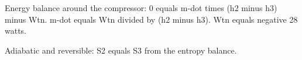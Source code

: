 Energy balance around the compressor:  
0 equals m-dot times (h2 minus h3) minus Wtn.  
m-dot equals Wtn divided by (h2 minus h3).  
Wtn equals negative 28 watts.  

Adiabatic and reversible:  
S2 equals S3 from the entropy balance.